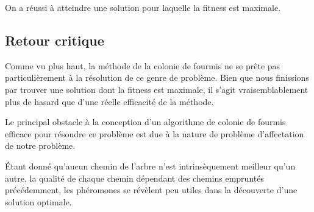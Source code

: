 On a réussi à atteindre une solution pour laquelle la fitness est maximale.


\subsection{Retour critique}\label{subsec:retour-critique}

Comme vu plus haut, la méthode de la colonie de fourmis ne se prête pas particulièrement à la résolution de ce genre de problème.
Bien que nous finissions par trouver une solution dont la fitness est maximale, il s'agit vraisemblablement plus de hasard que d'une réelle efficacité de la méthode.

Le principal obstacle à la conception d'un algorithme de colonie de fourmis efficace pour résoudre ce problème est due à la nature de problème d'affectation de notre problème.

Étant donné qu'aucun \og chemin \fg{} de l'arbre n'est intrinsèquement meilleur qu'un autre, la qualité de chaque chemin dépendant des chemins empruntés précédemment, les phéromones se révèlent peu utiles dans la découverte d'une solution optimale.